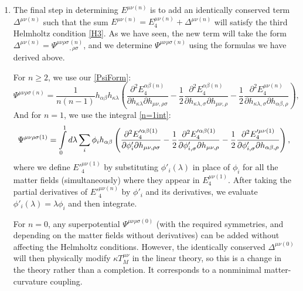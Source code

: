 \documentclass[aps,physrev,preprint,groupedaddress]{revtex4-2}
\begin{document}
\begin{enumerate}
The optional EOM terms are added to \(E_3^{\mu\nu(n)}\):
\begin{equation}
E_4^{\mu\nu(n)}=E_3^{\mu\nu(n)}+X'^{\mu\nu}_h{}_{\kappa\lambda}^{(n)}E^{\kappa\lambda(0)}+\sum_i X'^{\mu\nu(n)}_{\phi_i}E_{\phi_i}^{(0)}.
\end{equation}
\item  The final step in determining \(E^{\mu\nu(n)}\) is to add an identically conserved term \(\Delta^{\mu\nu(n)}\) such that the sum \(E^{\mu\nu(n)}=E_4^{\mu\nu(n)}+\Delta^{\mu\nu(n)}\) will satisfy the third Helmholtz condition \eqref{H3}. As we have seen, the new term will take the form \(\Delta^{\mu\nu(n)}=\Psi^{\mu\nu\rho\sigma}{}_{,\rho\sigma}^{(n)}\), and we determine \(\Psi^{\mu\nu\rho\sigma(n)}\) using the formulas we have derived above.

For \(n\ge 2\), we use our \eqref{PsiForm}:
\begin{equation}
     \Psi^{\mu\nu\rho\sigma(n)}=\frac{1}{n(n-1)}h_{\alpha\beta}h_{\kappa\lambda}\left(\frac{\partial^2 E_4^{\alpha\beta(n)}}{\partial h_{\kappa\lambda}\partial h_{\mu\nu,\rho\sigma}}-\frac{1}{2}\frac{\partial^2 E_4^{\alpha\beta(n)}}{\partial h_{\kappa\lambda,\sigma}\partial h_{\mu\nu,\rho}}-\frac{1}{2}\frac{\partial^2 E_4^{\mu\nu(n)}}{\partial h_{\kappa\lambda,\sigma}\partial h_{\alpha\beta,\rho}}\right),
\end{equation}
And for \(n=1\), we use the integral \eqref{n=1int}:
\begin{equation}
\Psi^{\mu\nu\rho\sigma(1)}=\intop_0^1d\lambda\sum_i\phi_ih_{\alpha\beta}\left(\frac{\partial^2 E'^{\alpha\beta(1)}_4}{\partial\phi'_i\partial h_{\mu\nu,\rho\sigma}}-\frac{1}{2}\frac{\partial^2 E'^{\alpha\beta(1)}_4}{\partial\phi'_{i,\sigma} \partial h_{\mu\nu,\rho}}-\frac{1}{2}\frac{\partial^2 E'^{\mu\nu(1)}_4}{\partial\phi'_{i,\sigma} \partial h_{\alpha\beta,\rho}}\right),
\end{equation}
where we define \(E'^{\mu\nu(1)}_4\) by substituting \(\phi'_i(\lambda)\) in place of \(\phi_i\) for all the matter fields (simultaneously) where they appear in \(E^{\mu\nu(1)}_4\). After taking the partial derivatives of \(E'^{\mu\nu(n)}_4\) by \(\phi'_i\) and its derivatives, we evaluate \(\phi'_i(\lambda)=\lambda\phi_i\) and then integrate.

For \(n=0\), any superpotential \(\Psi^{\mu\nu\rho\sigma(0)}\) (with the required symmetries, and depending on the matter fields without derivatives) can be added without affecting the Helmholtz conditions. However, the identically conserved \(\Delta^{\mu\nu(0)}\) will then physically modify \(\kappa T_M^{\mu\nu}\) in the linear theory, so this is a change in the theory rather than a completion. It corresponds to a nonminimal matter-curvature coupling.


\end{enumerate}
\end{document}
